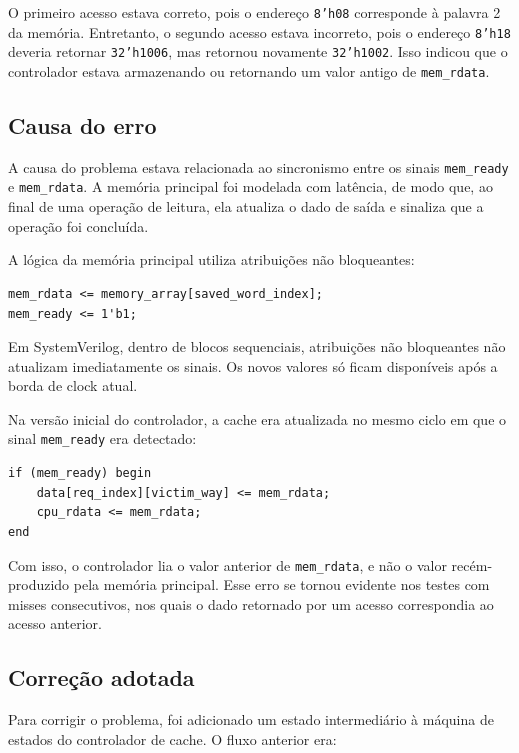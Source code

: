 ﻿\documentclass[12pt,a4paper]{article}
\begin{document}
O primeiro acesso estava correto, pois o endereço \texttt{8'h08} corresponde à palavra 2 da memória. Entretanto, o segundo acesso estava incorreto, pois o endereço \texttt{8'h18} deveria retornar \texttt{32'h1006}, mas retornou novamente \texttt{32'h1002}. Isso indicou que o controlador estava armazenando ou retornando um valor antigo de \texttt{mem\_rdata}.

\subsection{Causa do erro}

A causa do problema estava relacionada ao sincronismo entre os sinais \texttt{mem\_ready} e \texttt{mem\_rdata}. A memória principal foi modelada com latência, de modo que, ao final de uma operação de leitura, ela atualiza o dado de saída e sinaliza que a operação foi concluída.

A lógica da memória principal utiliza atribuições não bloqueantes:

\begin{verbatim}
mem_rdata <= memory_array[saved_word_index];
mem_ready <= 1'b1;
\end{verbatim}

Em SystemVerilog, dentro de blocos sequenciais, atribuições não bloqueantes não atualizam imediatamente os sinais. Os novos valores só ficam disponíveis após a borda de clock atual.

Na versão inicial do controlador, a cache era atualizada no mesmo ciclo em que o sinal \texttt{mem\_ready} era detectado:

\begin{verbatim}
if (mem_ready) begin
    data[req_index][victim_way] <= mem_rdata;
    cpu_rdata <= mem_rdata;
end
\end{verbatim}

Com isso, o controlador lia o valor anterior de \texttt{mem\_rdata}, e não o valor recém-produzido pela memória principal. Esse erro se tornou evidente nos testes com misses consecutivos, nos quais o dado retornado por um acesso correspondia ao acesso anterior.

\subsection{Correção adotada}

Para corrigir o problema, foi adicionado um estado intermediário à máquina de estados do controlador de cache. O fluxo anterior era:
\end{document}
